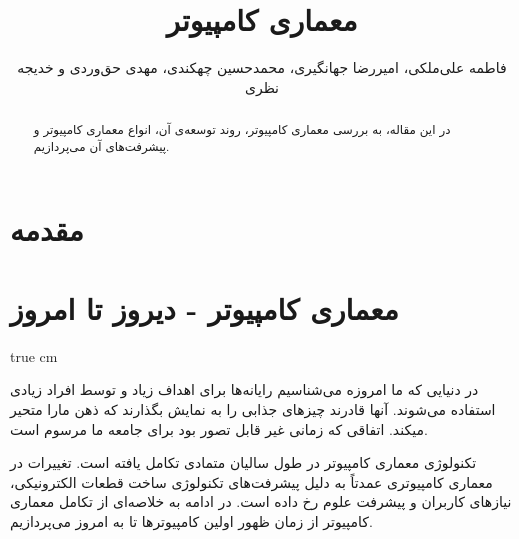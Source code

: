 \documentclass[11pt, twoside]{imsproc}
\title{معماری کامپیوتر \lr{(Computer Architecture)}}
\author{
فاطمه علی‌ملکی، امیررضا جهانگیری، محمدحسین چهکندی، مهدی حق‌وردی و خدیجه نظری
}
\begin{document}
\begin{abstract}
در این مقاله، به بررسی معماری کامپیوتر، روند توسعه‌ی آن، انواع معماری کامپیوتر و پیشرفت‌های آن می‌پردازیم.
\end{abstract}
\maketitle
\section{مقدمه}

\section{معماری کامپیوتر - دیروز تا امروز}
 true cm

در دنیایی که ما امروزه می‌شناسیم رایانه‌ها برای اهداف زیاد و توسط افراد زیادی استفاده می‌شوند. آنها قادرند چیزهای جذابی را به نمایش بگذارند که ذهن مارا متحیر میکند. اتفاقی که زمانی غیر قابل تصور بود برای جامعه ما مرسوم است.

تکنولوژی معماری کامپیوتر در طول سالیان متمادی تکامل یافته است. تغییرات در معماری کامپیوتری عمدتاً به دلیل پیشرفت‌های تکنولوژی ساخت قطعات الکترونیکی، نیاز‌های کاربران و پیشرفت علوم رخ داده است. در ادامه به خلاصه‌ای از تکامل معماری کامپیوتر از زمان ظهور اولین کامپیوترها تا به امروز می‌پردازیم. 
\end{document}
